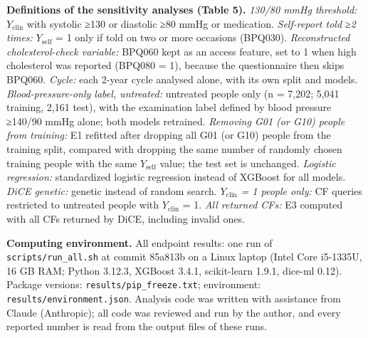 \documentclass[final,5p,times,twocolumn]{elsarticle}
\begin{document}
\textbf{Definitions of the sensitivity analyses (Table 5).} \emph{130/80
mmHg threshold:} \(Y_{\mathrm{clin}}\) with systolic ≥130 or diastolic
≥80 mmHg or medication. \emph{Self-report told ≥2 times:}
\(Y_{\mathrm{self}}\) = 1 only if told on two or more occasions
(BPQ030). \emph{Reconstructed cholesterol-check variable:} BPQ060 kept
as an access feature, set to 1 when high cholesterol was reported
(BPQ080 = 1), because the questionnaire then skips BPQ060. \emph{Cycle:}
each 2-year cycle analysed alone, with its own split and models.
\emph{Blood-pressure-only label, untreated:} untreated people only (n =
7,202; 5,041 training, 2,161 test), with the examination label defined
by blood pressure ≥140/90 mmHg alone; both models retrained.
\emph{Removing G01 (or G10) people from training:} E1 refitted after
dropping all G01 (or G10) people from the training split, compared with
dropping the same number of randomly chosen training people with the
same \(Y_{\mathrm{self}}\) value; the test set is unchanged.
\emph{Logistic regression:} standardized logistic regression instead of
XGBoost for all models. \emph{DiCE genetic:} genetic instead of random
search. \emph{\(Y_{\mathrm{clin}}\) = 1 people only:} CF queries
restricted to untreated people with \(Y_{\mathrm{clin}}\) = 1. \emph{All
returned CFs:} E3 computed with all CFs returned by DiCE, including
invalid ones.

\textbf{Computing environment.} All endpoint results: one run of
\texttt{scripts/\allowbreak{}run\_\allowbreak{}all.sh} at commit 85a813b
on a Linux laptop (Intel Core i5-1335U, 16 GB RAM; Python 3.12.3,
XGBoost 3.4.1, scikit-learn 1.9.1, dice-ml 0.12). Package versions:
\texttt{results/\allowbreak{}pip\_\allowbreak{}freeze.txt}; environment:
\texttt{results/\allowbreak{}environment.json}. Analysis code was
written with assistance from Claude (Anthropic); all code was reviewed
and run by the author, and every reported number is read from the output
files of these runs.
\end{document}
